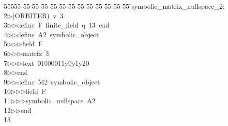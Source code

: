 %
%
\begin{tabbing}
55555 \= 55 \= 55 \= 55 \= 55 \= 55 \= 55 \= 55 \= 55 \= 55 \= 55 \= 55 \= 55 \= \>symbolic\_matrix\_nullspace\_2:\\[0pt]
2\>$\triangleright$\>(ORBITER)\ v\ 3\ \\[0pt]
3\>$\triangleright$\>$\triangleright$\>define\ F\ finite\_field\ q\ 13\ end\ \\[0pt]
4\>$\triangleright$\>$\triangleright$\>define\ A2\ symbolic\_object\ \\[0pt]
5\>$\triangleright$\>$\triangleright$\>$\triangleright$\>field\ F\ \\[0pt]
6\>$\triangleright$\>$\triangleright$\>$\triangleright$\>matrix\ 3\ \\[0pt]
7\>$\triangleright$\>$\triangleright$\>$\triangleright$\>text\ 01000011y0y1y20\ \\[0pt]
8\>$\triangleright$\>$\triangleright$\>end\ \\[0pt]
9\>$\triangleright$\>$\triangleright$\>define\ M2\ symbolic\_object\ \\[0pt]
10\>$\triangleright$\>$\triangleright$\>$\triangleright$\>field\ F\ \\[0pt]
11\>$\triangleright$\>$\triangleright$\>$\triangleright$\>symbolic\_nullspace\ A2\ \\[0pt]
12\>$\triangleright$\>$\triangleright$\>end\\[0pt]
13\>\end{tabbing}
